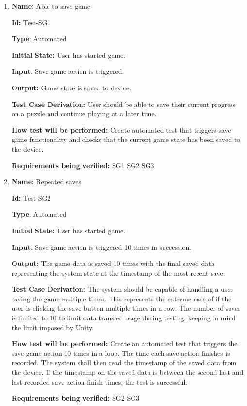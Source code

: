 \documentclass[12pt, titlepage]{article}
\begin{document}
\begin{enumerate}

\item{\textbf{Name:} Able to save game}

\textbf{Id:} Test-SG1

\textbf{Type}: Automated

\textbf{Initial State:} User has started game.

\textbf{Input:} Save game action is triggered.

\textbf{Output:}  Game state is saved to device.

\textbf{Test Case Derivation:} User should be able to save their current progress on a puzzle and continue playing at a later time.

\textbf{How test will be performed:} Create automated test that triggers save game functionality and checks that the current game state has been saved to the device.

\textbf{Requirements being verified: } SG1 SG2 SG3

\item{\textbf{Name:} Repeated saves}

\textbf{Id:} Test-SG2

\textbf{Type}: Automated

\textbf{Initial State:} User has started game.

\textbf{Input:} Save game action is triggered 10 times in succession.

\textbf{Output:} The game data is saved 10 times with the final saved data representing the system state at the timestamp of the most recent save.

\textbf{Test Case Derivation:}
The system should be capable of handling a user saving the game multiple times. This represents the extreme case of if the user is clicking the save button multiple times in a row. The number of saves is limited to 10 to limit data transfer usage during testing, keeping in mind the limit imposed by Unity.

\textbf{How test will be performed:}
Create an automated test that triggers the save game action 10 times in a loop. The time each save action finishes is recorded. The system shall then read the timestamp of the saved data from the device. If the timestamp on the saved data is between the second last and last recorded save action finish times, the test is successful. 

\textbf{Requirements being verified: } SG2 SG3


\end{enumerate}
\end{document}
